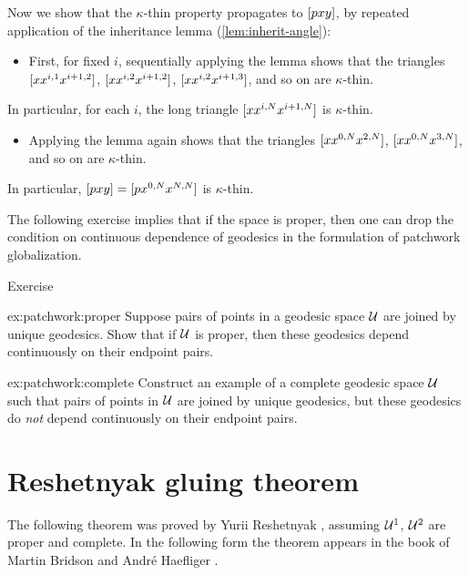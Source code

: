 Now we show that the $\kappa$-thin property propagates to $[{p}{x}{y}]$, by repeated application of the inheritance lemma (\ref{lem:inherit-angle}):
\begin{itemize}
\item 
First, for fixed $i$, 
sequentially applying the lemma shows  that the triangles 
$[{x}{x^{i,1}}{x^{i+1,2}}]$, 
$[{x}{x^{i,2}}{x^{i+1,2}}]$, 
$[{x}{x^{i,2}}{x^{i+1,3}}]$,
and so on are $\kappa$-thin. 
\end{itemize}
In particular, for each $i$, the long triangle $[{x}{x^{i,N}}{x^{i+1,N}}]$ is $\kappa$-thin.
\begin{itemize} 
\item 
Applying the lemma again shows that the  triangles $[{x}{x^{0,N}}{x^{2,N}}]$, $[{x}{x^{0,N}}{x^{3,N}}]$, and so on are $\kappa$-thin. 
\end{itemize}
In particular, $[{p}{x}{y}]=[{p}{x^{0,N}}{x^{N,N}}]$ is $\kappa$-thin.
\qeds

The following exercise implies that if the space is proper, then one can drop the condition on continuous dependence of geodesics in the formulation of patchwork globalization.

\begin{thm}{Exercise}\label{ex:patchwork}
\begin{subthm}{ex:patchwork:proper}
Suppose pairs of points in a geodesic space $\mathcal{U}$ are joined by unique geodesics.
Show that if $\mathcal{U}$ is proper, then 
these geodesics depend continuously on their endpoint pairs.
\end{subthm}

\begin{subthm}{ex:patchwork:complete}
Construct an example of a complete geodesic space $\mathcal{U}$ such that 
pairs of points in $\mathcal{U}$ are joined by unique geodesics, but
these geodesics do {}\emph{not} depend continuously on their endpoint pairs.
\end{subthm}
\end{thm}


\section{Reshetnyak gluing theorem}\label{sec:cba-gluing}

The following theorem was proved by Yurii Reshetnyak \cite{reshetnyak:major}, assuming $\mathcal{U}^1$, $\mathcal{U}^2$ are proper and complete. 
In the following form the theorem appears in the book of Martin Bridson and Andr\'e Haefliger \cite{bridson-haefliger}.

